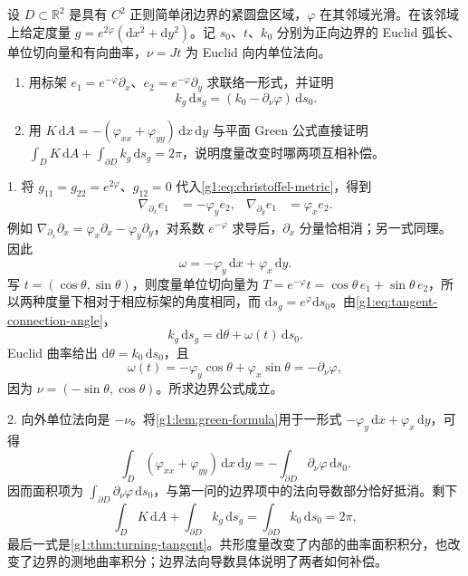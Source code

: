 \begin{exercise}
	\label{g1:ex:conformal-boundary-gauss-bonnet}
	设 \(D\subset\mathbb R^2\) 是具有 \(C^2\) 正则简单闭边界的紧圆盘区域，\(\varphi\) 在其邻域光滑。在该邻域上给定度量 \(g=e^{2\varphi}(\mathrm{d}x^2+\mathrm{d}y^2)\)。记 \(s_0\)、\(t\)、\(k_0\) 分别为正向边界的 Euclid 弧长、单位切向量和有向曲率，\(\nu=Jt\) 为 Euclid 向内单位法向。
	\begin{enumerate}
		\item 用标架 \(e_1=e^{-\varphi}\partial_x\)、\(e_2=e^{-\varphi}\partial_y\) 求联络一形式，并证明
		\[
			k_g\,\mathrm{d}s_g=(k_0-\partial_\nu\varphi)\,\mathrm{d}s_0.
		\]
		\item 用 \(K\,\mathrm{d}A=-(\varphi_{xx}+\varphi_{yy})\,\mathrm{d}x\,\mathrm{d}y\) 与平面 Green 公式直接证明 \(\int_DK\,\mathrm{d}A+\int_{\partial D}k_g\,\mathrm{d}s_g=2\pi\)，说明度量改变时哪两项互相补偿。
	\end{enumerate}
\end{exercise}
\begin{solution}
	1. 将 \(g_{11}=g_{22}=e^{2\varphi}\)、\(g_{12}=0\) 代入\eqref{g1:eq:christoffel-metric}，得到
	\begin{align*}
		\nabla_{\partial_x}e_1&=-\varphi_y e_2,&
		\nabla_{\partial_y}e_1&=\varphi_x e_2.
	\end{align*}
	例如 \(\nabla_{\partial_x}\partial_x=\varphi_x\partial_x-\varphi_y\partial_y\)，对系数 \(e^{-\varphi}\) 求导后，\(\partial_x\) 分量恰相消；另一式同理。因此
	\[
		\omega=-\varphi_y\,\mathrm{d}x+\varphi_x\,\mathrm{d}y.
	\]
	写 \(t=(\cos\theta,\sin\theta)\)，则度量单位切向量为 \(T=e^{-\varphi}t=\cos\theta\,e_1+\sin\theta\,e_2\)，所以两种度量下相对于相应标架的角度相同，而 \(\mathrm{d}s_g=e^\varphi\mathrm{d}s_0\)。由\eqref{g1:eq:tangent-connection-angle}，
	\[
		k_g\,\mathrm{d}s_g=\mathrm{d}\theta+\omega(t)\,\mathrm{d}s_0.
	\]
	Euclid 曲率给出 \(\mathrm{d}\theta=k_0\,\mathrm{d}s_0\)，且
	\[
		\omega(t)=-\varphi_y\cos\theta+\varphi_x\sin\theta
		=-\partial_\nu\varphi,
	\]
	因为 \(\nu=(-\sin\theta,\cos\theta)\)。所求边界公式成立。

	2. 向外单位法向是 \(-\nu\)。将\cref{g1:lem:green-formula}用于一形式 \(-\varphi_y\,\mathrm{d}x+\varphi_x\,\mathrm{d}y\)，可得
	\[
		\int_D(\varphi_{xx}+\varphi_{yy})\,\mathrm{d}x\,\mathrm{d}y
		=-\int_{\partial D}\partial_\nu\varphi\,\mathrm{d}s_0.
	\]
	因而面积项为 \(\int_{\partial D}\partial_\nu\varphi\,\mathrm{d}s_0\)，与第一问的边界项中的法向导数部分恰好抵消。剩下
	\[
		\int_DK\,\mathrm{d}A+\int_{\partial D}k_g\,\mathrm{d}s_g
		=\int_{\partial D}k_0\,\mathrm{d}s_0=2\pi,
	\]
	最后一式是\cref{g1:thm:turning-tangent}。共形度量改变了内部的曲率面积积分，也改变了边界的测地曲率积分；边界法向导数具体说明了两者如何补偿。
\end{solution}

